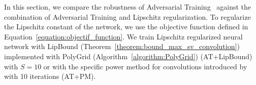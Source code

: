 

In this section, we compare the robustness of Adversarial Training~\cite{goodfellow2014explaining, madry2018towards} against the combination of Adversarial Training and Lipschitz regularization.
To regularize the Lipschitz constant of the network, we use the objective function defined in Equation~\ref{equation:objectif_function}.
We train Lipschitz regularized neural network with LipBound (Theorem~\ref{theorem:bound_max_sv_convolution}) implemented with PolyGrid (Algorithm~\ref{algorithm:PolyGrid}) (AT+LipBound) with $S = 10$ or with the specific power method for convolutions introduced by~\citet{farnia2018generalizable} with 10 iterations (AT+PM). 

